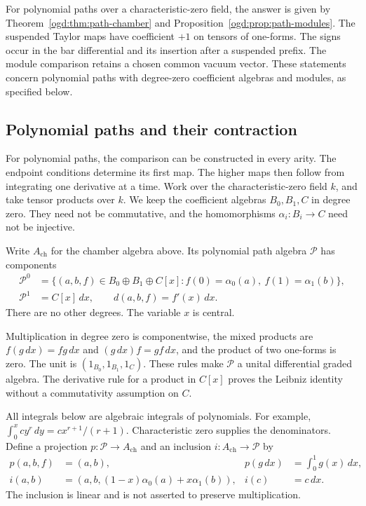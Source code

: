 For polynomial paths over a characteristic-zero field, the answer
is given by Theorem~\ref{ogd:thm:path-chamber} and
Proposition~\ref{ogd:prop:path-modules}.
The suspended Taylor maps have coefficient $+1$ on tensors of
one-forms. The signs occur in the bar differential and its insertion
after a suspended prefix.
The module comparison retains a chosen common vacuum vector.
These statements concern polynomial paths with degree-zero
coefficient algebras and modules, as specified below.

\subsection{Polynomial paths and their contraction}
\label{ogd:sec:polynomial-paths}

For polynomial paths, the comparison can be constructed in every arity.
The endpoint conditions determine its first map.
The higher maps then follow from integrating one derivative at a time.
Work over the characteristic-zero field \(k\), and take tensor products over \(k\).
We keep the coefficient algebras \(B_0,B_1,C\) in degree zero.
They need not be commutative, and the homomorphisms
\(\alpha_i:B_i\to C\) need not be injective.

Write\label{ogd:def:named-chamber-algebra} \(A_{\mathrm{ch}}\) for the chamber algebra above.
Its polynomial path algebra \(\mathcal P\) has components
\begin{equation}\label{ogd:eq:path-carrier}
\begin{split}
 \mathcal P^0
 &=\{(a,b,f)\in B_0\oplus B_1\oplus C[x]:
       f(0)=\alpha_0(a),\ f(1)=\alpha_1(b)\},\\
 \mathcal P^1&=C[x]\,dx,
 \qquad d(a,b,f)=f'(x)\,dx .
\end{split}
\end{equation}
There are no other degrees.
The variable \(x\) is central.

Multiplication in degree zero is componentwise, the mixed products are
\(f(g\,dx)=fg\,dx\) and \((g\,dx)f=gf\,dx\), and the product of two
one-forms is zero.
The unit is \((1_{B_0},1_{B_1},1_C)\).
These rules make \(\mathcal P\) a unital differential graded algebra.
The derivative rule for a product in \(C[x]\) proves the Leibniz identity
without a commutativity assumption on \(C\).

All integrals below are algebraic integrals of polynomials.
For example, \(\int_0^x c y^r\,dy=c x^{r+1}/(r+1)\).
Characteristic zero supplies the denominators.
Define a projection \(p:\mathcal P\to A_{\mathrm{ch}}\) and an inclusion
\(i:A_{\mathrm{ch}}\to\mathcal P\) by
\begin{equation}\label{ogd:eq:path-linear-maps}
\begin{aligned}
 p(a,b,f)&=(a,b),
 &p(g\,dx)&=\int_0^1g(x)\,dx,\\
 i(a,b)&=(a,b,(1-x)\alpha_0(a)+x\alpha_1(b)),
 &i(c)&=c\,dx .
\end{aligned}
\end{equation}
The inclusion is linear and is not asserted to preserve multiplication.


